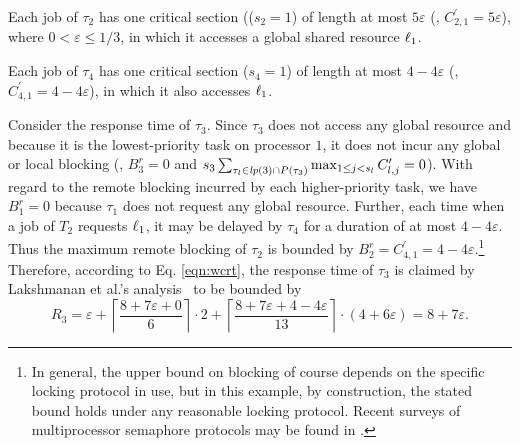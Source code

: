 Each job of $\tau_2$ has one critical section (($s_2 = 1$) of length at most $5\varepsilon$ (\ie, $C_{2,1}^{\prime} = 5\varepsilon$), where $0 < \varepsilon \leq 1/3$, in which it accesses a global shared resource $\ell_1$.

Each job of $\tau_4$ has one critical section ($s_4 = 1$) of length at most $4-4\varepsilon$ (\ie, $C_{4,1}^{\prime} = 4-4\varepsilon$), in which it also accesses $\ell_1$.

Consider the response time of $\tau_3$. Since $\tau_3$ does not access any global resource and because it is the lowest-priority task on processor $1$, it does not incur any global or local blocking (\ie, $B_3^r = 0$ and $s_3 \sum_{\tau_l \in \mathit{lp}(3) \cap P(\tau_3)} \max_{1 \leq j < s_l} C_{l,j}^{\prime} = 0$). With regard to the remote blocking incurred by each higher-priority task, we have $B_1^r = 0$ because $\tau_1$ does not request any global resource. Further, each time when a job of $T_2$ requests $\ell_1$, it may be delayed by $\tau_4$ for a duration of at most $4-4\varepsilon$. Thus the maximum remote blocking of $\tau_2$ is bounded by $B_2^r = C_{4,1}^{\prime} = 4-4\varepsilon$.\footnote{In general, the upper bound on blocking of course depends on the specific locking protocol in use, but in this example, by construction, the stated bound holds under any reasonable locking protocol. Recent surveys of multiprocessor semaphore protocols may be found in \cite{bbb-2013,yang-2015}.} Therefore, according to Eq. \eqref{eqn:wcrt}, the response time of $\tau_3$ is claimed by  Lakshmanan et al.'s analysis~\cite{lakshmanan-2009} to be bounded by
\begin{equation*}
R_3 = \varepsilon + \left \lceil \frac{8+7\varepsilon + 0}{6} \right \rceil \cdot 2 + \left \lceil \frac{8+7\varepsilon + 4-4\varepsilon}{13} \right \rceil \cdot (4+6\varepsilon) = 8+7\varepsilon.
\end{equation*}


